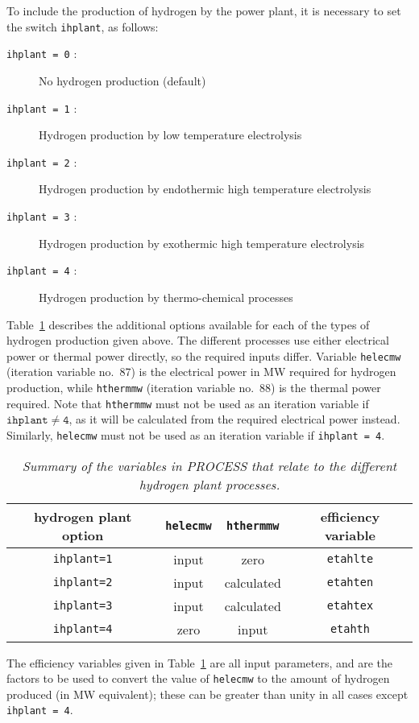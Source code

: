 \documentclass[11pt,a4paper]{report}
\begin{document}
To include the production of hydrogen by the power plant, it is necessary to
set the switch \texttt{ihplant}, as follows:
\begin{description}
\item [\texttt{ihplant = 0} :] No hydrogen production (default)
\item [\texttt{ihplant = 1} :] Hydrogen production by low temperature electrolysis
\item [\texttt{ihplant = 2} :] Hydrogen production by endothermic high
  temperature electrolysis
\item [\texttt{ihplant = 3} :] Hydrogen production by exothermic high
  temperature electrolysis
\item [\texttt{ihplant = 4} :] Hydrogen production by thermo-chemical processes
\end{description}
Table~\ref{tab:hplant} describes the additional options available for each of
the types of hydrogen production given above. The different processes use
either electrical power or thermal power directly, so the required inputs
differ. Variable \texttt{helecmw} (iteration variable no.\ 87) is the
electrical power in MW required for hydrogen production, while
\texttt{hthermmw} (iteration variable no.\ 88) is the thermal power
required. Note that \texttt{hthermmw} must not be used as an iteration
variable if $\mathtt{ihplant \not= 4}$, as it will be calculated from the
required electrical power instead. Similarly, \texttt{helecmw} must not be
used as an iteration variable if \texttt{ihplant = 4}.

\begin{table}[tbph]
\begin{center}
\begin{tabular}{||c|c|c|c||} \hline
hydrogen plant option & \texttt{helecmw} & \texttt{hthermmw} & efficiency
variable \\ \hline
\texttt{ihplant=1} & input & zero & \texttt{etahlte} \\
\texttt{ihplant=2} & input & calculated & \texttt{etahten} \\
\texttt{ihplant=3} & input & calculated & \texttt{etahtex} \\
\texttt{ihplant=4} & zero & input & \texttt{etahth} \\
\hline
\end{tabular}
\end{center}
\caption[Variables used in the hydrogen plant model]
{\label{tab:hplant}
  \textit{Summary of the variables in PROCESS that relate to
    the different hydrogen plant processes.}
}
\end{table}
The efficiency variables given in Table~\ref{tab:hplant} are all input
parameters, and are the factors to be used to convert the value of
\texttt{helecmw} to the amount of hydrogen produced (in MW equivalent); these
can be greater than unity in all cases except \texttt{ihplant = 4}.
\end{document}
